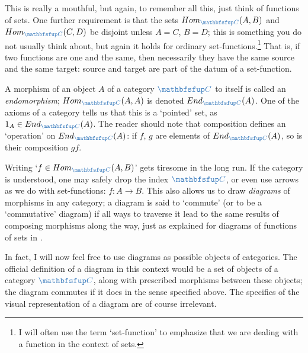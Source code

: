 This is really a mouthful, but again, to remember all this, just think
of functions of sets. One further requirement is that the sets
$\Hom_{\categ{C}}(A, B)$ and $\Hom_{\categ{C}}(C, D)$ be disjoint
unless $A = C$, $B = D$; this is something you do not usually think
about, but again it holds for ordinary set-functions.\footnote{I will
  often use the term `set-function' to emphasize that we are dealing
  with a function in the context of sets.} That is, if two functions
are one and the same, then necessarily they have the same source and
the same target: source and target are part of the datum of a
set-function.

A morphism of an object $A$ of a category $\categ{C}$ to itself is
called an \emph{endomorphism};
$\Hom_{\categ{C}}(A, A)$ is denoted $\End_{\categ{C}}(A)$. One of the
axioms of a category tells us that this is a `pointed' set, as
$1_A \in \End_{\categ{C}}(A)$.  The reader should note that
composition defines an `operation' on $\End_{\categ{C}}(A)$: if $f$,
$g$ are elements of $\End_{\categ{C}}(A)$, so is their composition
$gf$.

Writing `$f \in \Hom_{\categ{C}}(A, B)$' gets tiresome in the long
run. If the category is understood, one may safely drop the index
$\categ{C}$, or even use arrows as we do with set-functions:
$f : A \to B$.  This also allows us to draw \emph{diagrams} of
morphisms in any category; a diagram is said to `commute' (or to be a
`commutative' diagram) if all ways to traverse it lead to the same
results of composing morphisms along the way, just as explained for
diagrams of functions of sets in
.

In fact, I will now feel free to use diagrams as possible objects of
categories.  The official definition of a diagram in this context
would be a set of objects of a category $\categ{C}$, along with
prescribed morphisms between these objects; the diagram commutes if it
does in the sense specified above. The specifics of the visual
representation of a diagram are of course irrelevant.

